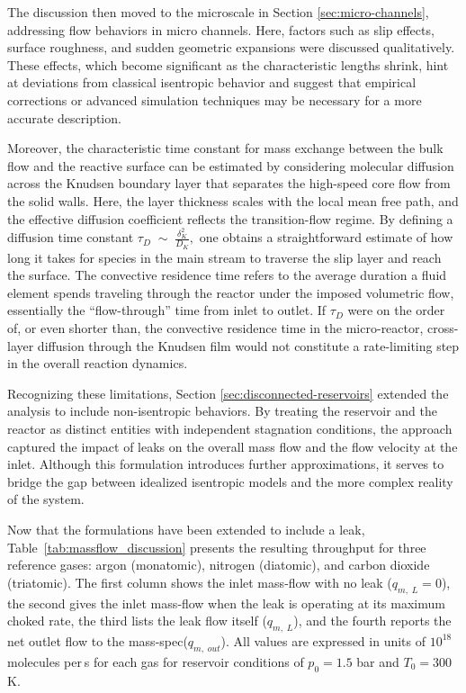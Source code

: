 The discussion then moved to the microscale in Section \ref{sec:micro-channels}, addressing flow behaviors in micro channels.
Here, factors such as slip effects, surface roughness, and sudden geometric expansions were discussed qualitatively.
These effects, which become significant as the characteristic lengths shrink, hint at deviations from classical isentropic behavior and suggest that empirical corrections or advanced simulation techniques may be necessary for a more accurate description.

Moreover, the characteristic time constant for mass exchange between the bulk flow and the reactive surface can be estimated by considering molecular diffusion across the Knudsen boundary layer that separates the high-speed core flow from the solid walls.
Here, the layer thickness scales with the local mean free path, and the effective diffusion coefficient reflects the transition-flow regime.
By defining a diffusion time constant $\tau_{D}\;\sim\;\frac{\delta_{K}^{2}}{D_{K}},$ one obtains a straightforward estimate of how long it takes for species in the main stream to traverse the slip layer and reach the surface.
The convective residence time refers to the average duration a fluid element spends traveling through the reactor under the imposed volumetric flow, essentially the “flow-through” time from inlet to outlet.
If $\tau_{D}$ were on the order of, or even shorter than, the convective residence time in the micro-reactor, cross-layer diffusion through the Knudsen film would not constitute a rate-limiting step in the overall reaction dynamics.

Recognizing these limitations, Section \ref{sec:disconnected-reservoirs} extended the analysis to include non-isentropic behaviors.
By treating the reservoir and the reactor as distinct entities with independent stagnation conditions, the approach captured the impact of leaks on the overall mass flow and the flow velocity at the inlet.
Although this formulation introduces further approximations, it serves to bridge the gap between idealized isentropic models and the more complex reality of the system.

Now that the formulations have been extended to include a leak, Table~\ref{tab:massflow_discussion} presents the resulting throughput for three reference gases: argon (monatomic), nitrogen (diatomic), and carbon dioxide (triatomic).
The first column shows the inlet mass‐flow with no leak ($q_{m,\;L}=0$), the second gives the inlet mass‐flow when the leak is operating at its maximum choked rate, the third lists the leak flow itself ($q_{m,\;L}$), and the fourth reports the net outlet flow to the mass-spec($q_{m,\;out}$).
All values are expressed in units of $10^{18}$ molecules per s for each gas for reservoir conditions of $p_0 = 1.5$ bar and $T_0 = 300$ K.

